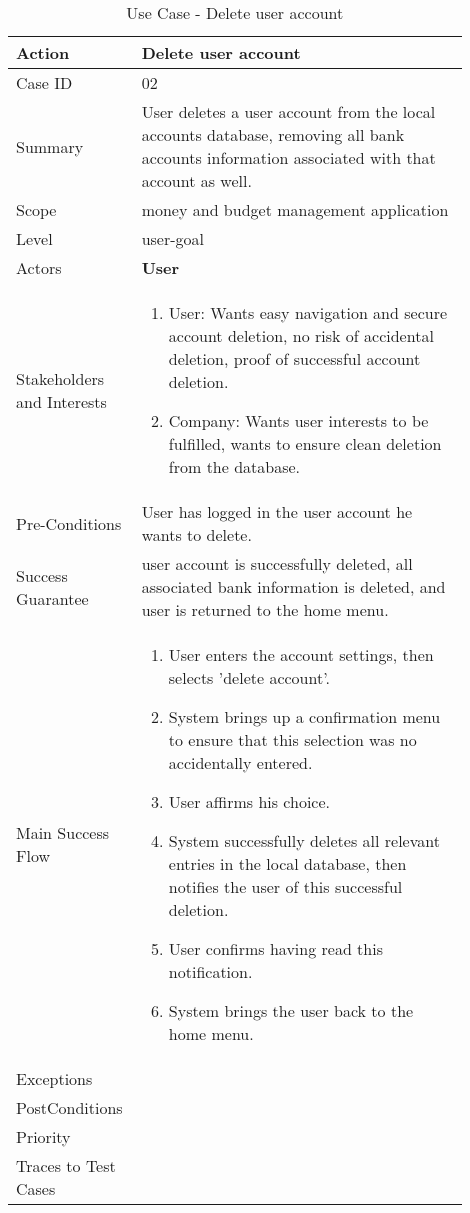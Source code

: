 \documentclass[11pt]{article}
\newcounter{use case ID}
\newcommand\tabularhead[1]{
\begin{table}[ht]
    \addtocounter{use case ID}{1}
    \caption{Use Case \arabic{use case ID} - #1}
    \vspace{0.2cm}
    \begin{tabular}{|p{0.2\linewidth}|p{0.70\linewidth}|}
    \hline
        \textbf{Action} & \textbf{#1} \\
        \hline}
\newcommand\addrow[2]{#1 & #2\\ \hline}
\newcommand\addmulrow[2]{ \begin{minipage}[t][][t]{2.5cm}#1\end{minipage}
        &\begin{minipage}[t][][t]{11cm}
        \begin{enumerate}[itemsep=-1ex] #2   \end{enumerate}
    \end{minipage}\vfill\\ \hline}
\newenvironment{usecase}{\tabularhead}
{\hline\end{tabular}\end{table}}
\begin{document}
\begin{usecase}{Delete user account}
    \addrow{Case ID}{02}
    \addrow{Summary}{User deletes a user account from the local accounts database, removing all bank accounts information associated with that account as well.}
    \addrow{Scope}{money and budget management application}
    \addrow{Level}{user-goal}
    \addrow{Actors}{\textbf{User}}
    \addmulrow{Stakeholders and Interests}{
        \item User: Wants easy navigation and secure account deletion, no risk of accidental deletion, proof of successful account deletion.
        \item Company: Wants user interests to be fulfilled, wants to ensure clean deletion from the database. }
    \addrow{Pre-Conditions}{User has logged in the user account he wants to delete.}
    \addrow{Success Guarantee}{user account is successfully deleted, all associated bank information is deleted, and user is returned to the home menu.}
    \addmulrow{Main Success Flow}{
        \item User enters the account settings, then selects 'delete account'.
        \item System brings up a confirmation menu to ensure that this selection was no accidentally entered.
        \item User affirms his choice.
        \item System successfully deletes all relevant entries in the local database, then notifies the user of this successful deletion.
        \item User confirms having read this notification.
        \item System brings the user back to the home menu.}
    \addrow{Exceptions}{}
    \addrow{PostConditions}{}
    \addrow{Priority}{}
    \addrow{Traces to Test Cases}{}
\end{usecase}
\end{document}

